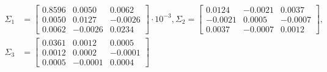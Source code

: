 \documentclass{ethz_report}
\begin{document}
\begin{equation}
    \begin{split}
        \Sigma_1&= \begin{bmatrix}
            0.8596 &  0.0050 &  0.0062 \\
            0.0050 &  0.0127 & -0.0026 \\
            0.0062 & -0.0026 &  0.0234
        \end{bmatrix} \cdot 10^{-3},
        \Sigma_2 = \begin{bmatrix}
            0.0124 & -0.0021 &  0.0037 \\
            -0.0021 &  0.0005 & -0.0007 \\
            0.0037 & -0.0007 &  0.0012
        \end{bmatrix}, \\
        \Sigma_3&= \begin{bmatrix}
            0.0361 &  0.0012 &  0.0005 \\
            0.0012 &  0.0002 & -0.0001 \\
            0.0005 & -0.0001 &  0.0004
        \end{bmatrix}
    \end{split}
\end{equation}
\end{document}
